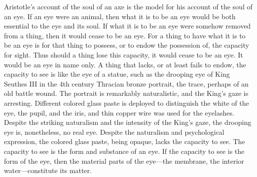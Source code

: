 Aristotle's account of the soul of an axe is the model for his account of the soul of an eye. If an eye were an animal, then what it is to be an eye would be both essential to the eye and its soul. If what it is to be an eye were somehow removed from a thing, then it would cease to be an eye. For a thing to have what it is to be an eye is for that thing to possess, or to endow the possession of, the capacity for sight. Thus should a thing lose this capacity, it would cease to be an eye. It would be an eye in name only. A thing that lacks, or at least fails to endow, the capacity to see is like the eye of a statue, such as the drooping eye of King Seuthes III in the 4th century Thracian bronze portrait, the trace, perhaps of an old battle wound. The portrait is remarkably naturalistic, and the King's gaze is arresting. Different colored glass paste is deployed to distinguish the white of the eye, the pupil, and the iris, and thin copper wire was used for the eyelashes. Despite the striking naturalism and the intensity of the King's gaze, the drooping eye is, nonetheless, no real eye. Despite the naturalism and psychological expression, the colored glass paste, being opaque, lacks the capacity to see. The capacity to see is the form and substance of an eye. If the capacity to see is the form of the eye, then the material parts of the eye---the membrane, the interior water---constitute its matter.

